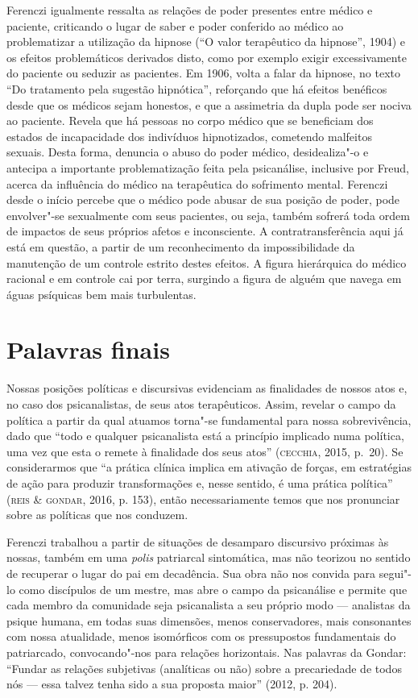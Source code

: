 Ferenczi igualmente ressalta as relações de poder presentes entre médico
e paciente, criticando o lugar de saber e poder conferido ao médico ao
problematizar a utilização da hipnose (``O valor terapêutico da hipnose'',
1904) e os efeitos problemáticos derivados disto, como por exemplo
exigir excessivamente do paciente ou seduzir as pacientes. Em 1906,
volta a falar da hipnose, no texto ``Do tratamento pela sugestão
hipnótica'', reforçando que há efeitos benéficos desde que os médicos
sejam honestos, e que a assimetria da dupla pode ser nociva ao paciente.
Revela que há pessoas no corpo médico que se beneficiam dos estados de
incapacidade dos indivíduos hipnotizados, cometendo malfeitos sexuais.
Desta forma, denuncia o abuso do poder médico, desidealiza"-o e antecipa
a importante problematização feita pela psicanálise, inclusive por
Freud, acerca da influência do médico na terapêutica do sofrimento
mental. Ferenczi desde o início percebe que o médico pode abusar de sua
posição de poder, pode envolver"-se sexualmente com seus pacientes, ou
seja, também sofrerá toda ordem de impactos de seus próprios afetos e
inconsciente. A contratransferência aqui já está em questão, a partir de
um reconhecimento da impossibilidade da manutenção de um controle
estrito destes efeitos. A figura hierárquica do médico racional e em
controle cai por terra, surgindo a figura de alguém que navega em águas
psíquicas bem mais turbulentas.

\section{Palavras finais}

Nossas posições políticas e discursivas evidenciam as finalidades de
nossos atos e, no caso dos psicanalistas, de seus atos terapêuticos.
Assim, revelar o campo da política a partir da qual atuamos torna"-se
fundamental para nossa sobrevivência, dado que ``todo e qualquer
psicanalista está a princípio implicado numa política, uma vez que esta
o remete à finalidade dos seus atos'' (\textsc{cecchia}, 2015, p.~20). Se
considerarmos que ``a prática clínica implica em ativação de forças, em
estratégias de ação para produzir transformações e, nesse sentido, é uma
prática política'' (\textsc{reis} \& \textsc{gondar}, 2016, p. 153), então necessariamente
temos que nos pronunciar sobre as políticas que nos conduzem.

Ferenczi trabalhou a partir de situações de desamparo discursivo
próximas às nossas, também em uma \emph{polis} patriarcal sintomática,
mas não teorizou no sentido de recuperar o lugar do pai em decadência.
Sua obra não nos convida para segui"-lo como discípulos de um mestre, mas
abre o campo da psicanálise e permite que cada membro da comunidade seja
psicanalista a seu próprio modo --- analistas da psique humana, em todas
suas dimensões, menos conservadores, mais consonantes com nossa
atualidade, menos isomórficos com os pressupostos fundamentais do
patriarcado, convocando"-nos para relações horizontais. Nas palavras da
Gondar: ``Fundar as relações subjetivas (analíticas ou
não) sobre a precariedade de todos nós --- essa talvez tenha sido a sua
proposta maior'' (2012, p. 204).

